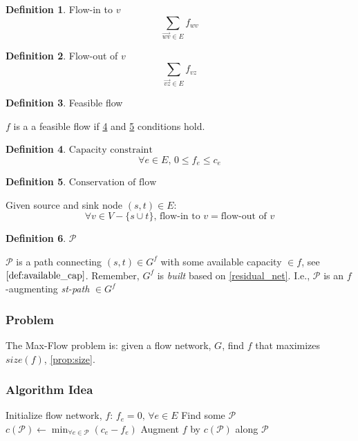 \documentclass{article}
\theoremstyle{definition}
\newtheorem{definition}{Definition}[section]
\begin{document}
\begin{definition}{Flow-in to $v$}
\label{def:flowin}
$$\sum_{\overrightarrow{wv} \in E}{f_{wv}}$$
\end{definition}

\begin{definition}{Flow-out of $v$}
\label{def:flowout}
$$\sum_{\overrightarrow{vz} \in E}{f_{vz}}$$
\end{definition}

\begin{definition}{Feasible flow}
	
	$f$ is a a feasible flow if \ref{prop:capacity} and \ref{prop:conservation} conditions hold.
\end{definition}

\begin{definition}{$\text{Capacity constraint}$}
\label{prop:capacity}
$$\forall e \in E, \, 0 \leq f_e \leq c_e$$
\end{definition}

\begin{definition}{$\text{Conservation of flow}$}
\label{prop:conservation}

Given source and sink node $(s,t) \in E$:
$$\forall v \in V - \{s \cup t\}, \, \text{flow-in to } v = \text{flow-out of } v$$ 
\end{definition}

\begin{definition}{$\mathcal{P}$}
\label{prop:cal_p}	

	$\mathcal{P}$ is a path connecting $(s,t) \in G^f$ with some available capacity $\in f$,  see $\ref{def:available_cap}$. Remember, $G^f$ is \textit{built} based on \ref{residual_net}. I.e., $\mathcal{P}$ is an $f$-augmenting \textit{st-path} $\in G^f$
\end{definition}

\subsubsection{Problem}
The Max-Flow problem is: given a flow network, $G$, find $f$ that maximizes $size(f)$, \ref{prop:size}.

\subsubsection{Algorithm Idea}
\begin{algorithm}
\caption{$NaiveMaxFlow$}
\label{alg:naive_max_flow}
\begin{algorithmic}[1]
	\STATE Initialize flow network, $f$: $f_e = 0, \, \forall e \in E$
	\STATE Find some $\mathcal{P}$ 
		\STATE $c(\mathcal{P}) \gets \min_{\forall e \in \mathcal{P}} (c_e-f_e)$
		\STATE Augment $f$ by $c(\mathcal{P})$ along $\mathcal{P}$
	\ENDWHILE
\end{algorithmic}
\end{algorithm}
\end{document}
